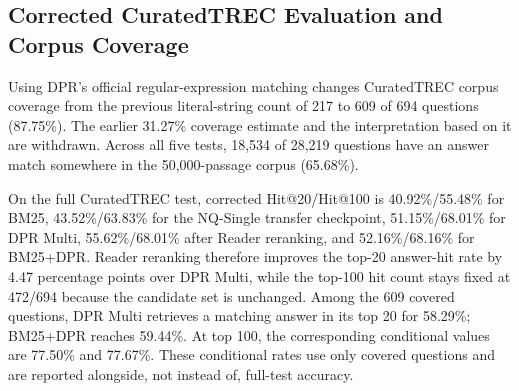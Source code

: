 

\subsection{Corrected CuratedTREC Evaluation and Corpus Coverage}
Using DPR's official regular-expression matching changes CuratedTREC corpus coverage from the previous literal-string count of 217 to 609 of 694 questions (87.75\%). The earlier 31.27\% coverage estimate and the interpretation based on it are withdrawn. Across all five tests, 18,534 of 28,219 questions have an answer match somewhere in the 50,000-passage corpus (65.68\%).



On the full CuratedTREC test, corrected Hit@20/Hit@100 is 40.92\%/55.48\% for BM25, 43.52\%/63.83\% for the NQ-Single transfer checkpoint, 51.15\%/68.01\% for DPR Multi, 55.62\%/68.01\% after Reader reranking, and 52.16\%/68.16\% for BM25+DPR. Reader reranking therefore improves the top-20 answer-hit rate by 4.47 percentage points over DPR Multi, while the top-100 hit count stays fixed at 472/694 because the candidate set is unchanged. Among the 609 covered questions, DPR Multi retrieves a matching answer in its top 20 for 58.29\%; BM25+DPR reaches 59.44\%. At top 100, the corresponding conditional values are 77.50\% and 77.67\%. These conditional rates use only covered questions and are reported alongside, not instead of, full-test accuracy.
